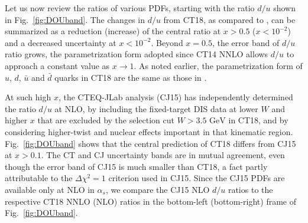 Let us now review the ratios of various
PDFs, starting with the ratio $d/u$ shown in
Fig.~\ref{fig:DOUband}. The changes in $d/u$ from CT18, as compared
to \CTHERAII, can be summarized as a reduction (increase) of the central ratio at $x > 0.5$ ($x<10^{-2}$) and a decreased uncertainty at $x < 10^{-2}$.
Beyond $x=0.5$, the error band of $d/u$ ratio grows,
the parametrization form adopted since CT14 NNLO \cite{Dulat:2015mca}
allows $d/u$ to approach a constant value as $x\rightarrow 1$.
As noted earlier, the parametrization form of $u$, $d$, $\bar u$ and $\bar d$ quarks in CT18 are the same as those in \CTHERAII. 

At such high $x$, the CTEQ-JLab analysis (CJ15) \cite{Accardi:2016qay}
has independently determined the ratio $d/u$ at NLO, by
including the fixed-target DIS data at lower $W$ and higher $x$
that are excluded by the selection cut $W > 3.5 \mbox{ GeV}$ in
CT18,  and by considering higher-twist and nuclear effects
important in that kinematic region. 
Fig.~\ref{fig:DOUband} shows that the central prediction of CT18 
differs from CJ15 at $x > 0.1$. The CT and CJ uncertainty bands are in mutual agreement, even though the error band of CJ15 is much smaller than 
CT18, a fact partly attributable
to the $\Delta \chi^2 = 1$ criterion used in CJ15.
Since the CJ15 PDFs are available only at NLO in $\alpha_s$,
we compare the CJ15 NLO $d/u$ ratios to the respective CT18 NNLO (NLO) ratios in the bottom-left (bottom-right) frame of Fig.~\ref{fig:DOUband}.


